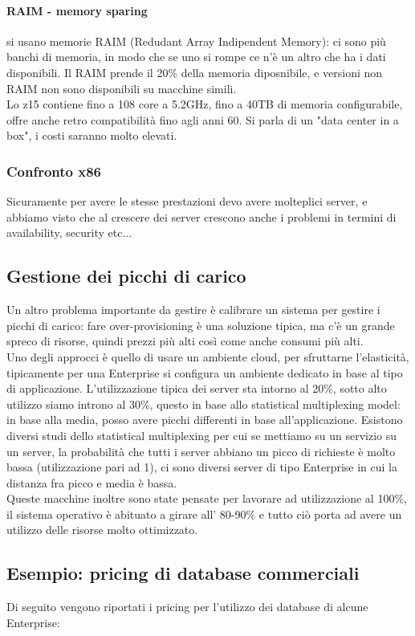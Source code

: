 \documentclass{article}
\begin{document}
\paragraph{RAIM - memory sparing}si usano memorie RAIM (Redudant Array Indipendent Memory): ci sono più banchi di memoria, in modo che se uno si rompe ce n'è un altro che ha i dati disponibili. Il RAIM prende il 20\% della memoria diposnibile, e versioni non RAIM non sono disponibili su macchine simili.\\ Lo z15 contiene fino a 108 core a 5.2GHz, fino a 40TB di memoria configurabile, offre anche retro compatibilità fino agli anni 60. Si parla di un "data center in a box", i costi saranno molto elevati.
\subsubsection{Confronto x86}
Sicuramente per avere le stesse prestazioni devo avere molteplici server, e abbiamo visto che al crescere dei server crescono anche i problemi in termini di availability, security etc...
\subsection{Gestione dei picchi di carico}
Un altro problema importante da gestire è calibrare un sistema per gestire i picchi di carico: fare over-provisioning è una soluzione tipica, ma c'è un grande spreco di risorse, quindi prezzi più alti così come anche consumi più alti.\\ Uno degli approcci è quello di usare un ambiente cloud, per sfruttarne l'elasticità, tipicamente per una Enterprise si configura un ambiente dedicato in base al tipo di applicazione. L'utilizzazione tipica dei server sta intorno al 20\%, sotto alto utilizzo siamo introno al 30\%, questo in base allo statistical multiplexing model: in base alla media, posso avere picchi differenti in base all'applicazione. Esistono diversi studi dello statistical multiplexing per cui se mettiamo su un servizio su un server, la probabilità che tutti i server abbiano un picco di richieste è molto bassa (utilizzazione pari ad 1), ci sono diversi server di tipo Enterprise in cui la distanza fra picco e media è bassa.\\ Queste macchine inoltre sono state pensate per lavorare ad utilizzazione al 100\%, il sistema operativo è abituato a girare all' 80-90\% e tutto ciò porta ad avere un utilizzo delle risorse molto ottimizzato.
\subsection{Esempio: pricing di database commerciali}
Di seguito vengono riportati i pricing per l'utilizzo dei database di alcune Enterprise:
\end{document}
